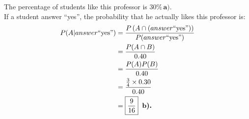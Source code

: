 \documentclass[a4paper, 10pt]{article}
\begin{document}
\begin{tosubmit}
The percentage of students like this professor is \( \boxed{30\%} \, \textbf{a).} \) \\

If a student answer ``yes'', the probability that he actually likes this professor is:
\begin{align*}
    P(A|answer \text{``yes''}) &= \frac{P\left(A \cap \left(answer \text{``yes''}\right)\right)}{P(answer \text{``yes''})}\\
    &= \frac{P(A \cap B)}{0.40} \\
    &= \frac{P(A)P(B)}{0.40} \\
    &= \frac{\frac{3}{4} \times 0.30}{0.40} \\
    &= \boxed{\frac{9}{16}} \textbf{\, b).}
\end{align*}
\end{tosubmit}
\end{document}
